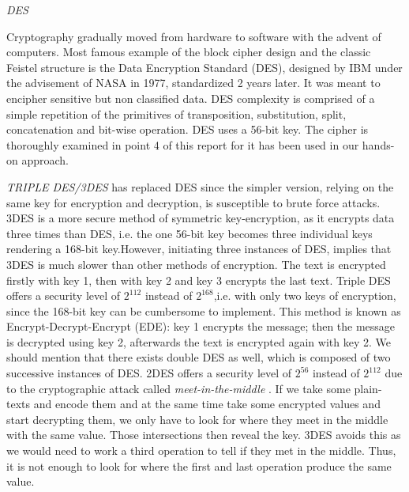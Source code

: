 \textit{DES}

Cryptography gradually moved from hardware to software with the advent of computers. Most famous example of the block cipher design and the classic Feistel structure is the Data Encryption Standard (DES), designed by IBM under the advisement of NASA in 1977, standardized 2 years later. It was meant to encipher sensitive but non classified data. DES complexity is comprised of a simple repetition of the primitives of transposition, substitution, split, concatenation and bit-wise operation. DES uses a 56-bit key. The cipher is thoroughly examined in point 4 of this report for it has been used in our hands-on approach.

\textit{TRIPLE DES/3DES} has replaced DES since the simpler version, relying on the same key for encryption and decryption, is susceptible to brute force attacks. 3DES is a more secure method of symmetric key-encryption, as it encrypts data three times than DES, i.e. the one 56-bit key becomes three individual keys rendering a 168-bit key.However, initiating three instances of DES, implies that 3DES is much slower than other methods of encryption. The text is encrypted firstly with key 1, then with key 2 and key 3 encrypts the last text. Triple DES offers a security level of $2^{112}$ instead of $2^{168}$,i.e. with only two keys of encryption, since the 168-bit key can be cumbersome to implement. This method is known as Encrypt-Decrypt-Encrypt (EDE): key 1 encrypts the message; then the message is decrypted using key 2, afterwards the text is encrypted again with key 2. We should mention that there exists double DES as well, which is composed of two successive instances of DES. 2DES offers a security level of $2^{56}$ instead of $2^{112}$ due to the cryptographic attack called \emph{meet-in-the-middle} \cite{mitm}. If we take some plain-texts and encode them and at the same time take some encrypted values and start decrypting them, we only have to look for where they meet in the middle with the same value. Those intersections then reveal the key. 3DES avoids this as we would need to work a third operation to tell if they met in the middle. Thus, it is not enough to look for where the first and last operation produce the same value.

